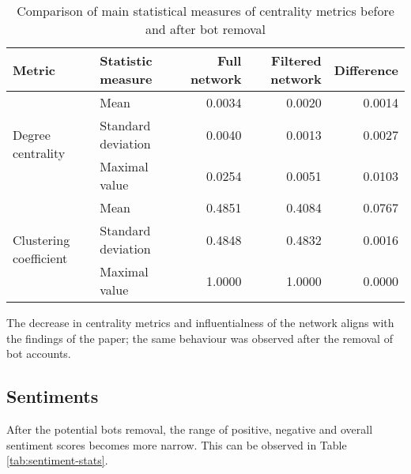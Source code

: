 \begin{table}[]
\caption{Comparison of main statistical measures of centrality metrics before and after bot removal}
\label{tab:stats-centrality}
\begin{tabular}{llrrr} \toprule
\textbf{Metric}                         & \textbf{Statistic measure} & \textbf{Full network} & \textbf{Filtered network} & \textbf{Difference} \\ \midrule
\multirow{3}{*}{Degree centrality}      & Mean                       & 0.0034                      & 0.0020                     & 0.0014              \\
                                        & Standard deviation         & 0.0040                      & 0.0013                     & 0.0027              \\
                                        & Maximal value              & 0.0254                      & 0.0051                     & 0.0103              \\
\multirow{3}{*}{Clustering coefficient} & Mean                       & 0.4851                      & 0.4084                     & 0.0767              \\
                                        & Standard deviation         & 0.4848                      & 0.4832                     & 0.0016              \\
                                        & Maximal value              & 1.0000                      & 1.0000                     & 0.0000    \\ \bottomrule         
\end{tabular}
\end{table}

The decrease in centrality metrics and influentialness of the network aligns with the findings of the paper\cite{Hagen2022}; the same behaviour was observed after the removal of bot accounts.

\subsection{Sentiments}
After the potential bots removal, the range of positive, negative and overall sentiment scores becomes more narrow. This can be observed in Table \ref{tab:sentiment-stats}.

